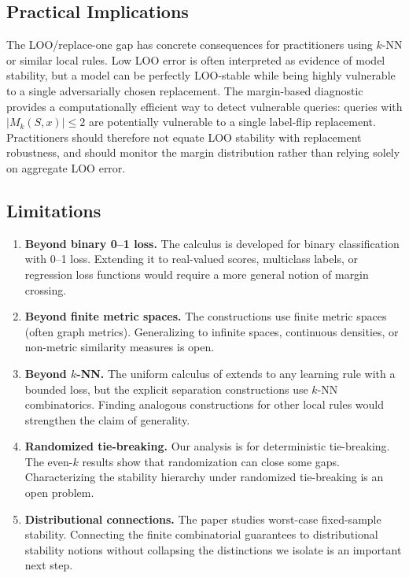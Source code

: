 \subsection{Practical Implications}

The LOO/replace-one gap has concrete consequences for practitioners using
$k$-NN or similar local rules. Low LOO error is often interpreted as evidence of
model stability, but a model can be perfectly LOO-stable while being highly
vulnerable to a single adversarially chosen replacement. The margin-based
diagnostic provides a computationally efficient way to detect vulnerable
queries: queries with $|M_k(S,x)| \le 2$ are potentially vulnerable to a single
label-flip replacement. Practitioners should therefore not equate LOO stability
with replacement robustness, and should monitor the margin distribution rather
than relying solely on aggregate LOO error.

\subsection{Limitations}

\begin{enumerate}[leftmargin=*,label=(\arabic*)]
    \item \textbf{Beyond binary 0--1 loss.} The calculus is developed for binary
        classification with 0--1 loss. Extending it to real-valued scores,
        multiclass labels, or regression loss functions would require a more
        general notion of margin crossing.
    \item \textbf{Beyond finite metric spaces.} The constructions use finite
        metric spaces (often graph metrics). Generalizing to infinite spaces,
        continuous densities, or non-metric similarity measures is open.
    \item \textbf{Beyond $k$-NN.} The uniform calculus of 
        extends to any learning rule with a bounded loss, but the explicit
        separation constructions use $k$-NN combinatorics. Finding analogous
        constructions for other local rules would strengthen the claim of
        generality.
    \item \textbf{Randomized tie-breaking.} Our analysis is for deterministic
        tie-breaking. The even-$k$ results show that randomization can close
        some gaps. Characterizing the stability hierarchy under randomized
        tie-breaking is an open problem.
    \item \textbf{Distributional connections.} The paper studies worst-case
        fixed-sample stability. Connecting the finite combinatorial guarantees
        to distributional stability notions without collapsing the distinctions
        we isolate is an important next step.
\end{enumerate}

